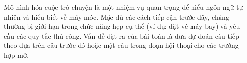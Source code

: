 Mô hình hóa cuộc trò chuyện là một nhiệm vụ quan trọng để hiểu ngôn ngữ tự nhiên và hiểu biết về máy móc. Mặc dù các
cách tiếp cận trước đây, chúng thường bị giới hạn trong chức năng hẹp cụ thể (ví dụ: đặt vé máy bay) và yêu cầu
các quy tắc thủ công. Vấn đề đặt ra của bài toán là đưa dự đoán câu tiếp theo dựa trên câu trước đó hoặc một câu
trong đoạn hội thoại cho các trường hợp mở.